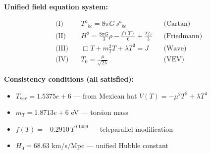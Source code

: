 
\textbf{Unified field equation system:}

\begin{align}
  \text{(I)} \quad & T^a{}_{bc} = 8\pi G \, s^a{}_{bc} && \text{(Cartan)} \\
  \text{(II)} \quad & H^2 = \frac{8\pi G}{3}\rho - \frac{f(T)}{6} + \frac{Tf_T}{3} && \text{(Friedmann)} \\
  \text{(III)} \quad & \Box T + m_T^2 T + \lambda T^3 = J && \text{(Wave)} \\
  \text{(IV)} \quad & T_0 = \frac{\mu}{\sqrt{2\lambda}} && \text{(VEV)}
\end{align}

\textbf{Consistency conditions (all satisfied):}
\begin{itemize}
  \item $T_{\text{vev}} = 1.5375e+6$ — from Mexican hat $V(T) = -\mu^2 T^2 + \lambda T^4$
  \item $m_T = 1.8713e+6$ eV — torsion mass
  \item $f(T) = -0.2910 \, T^{0.1459}$ — teleparallel modification
  \item $H_0 = 68.63$ km/s/Mpc — unified Hubble constant
\end{itemize}